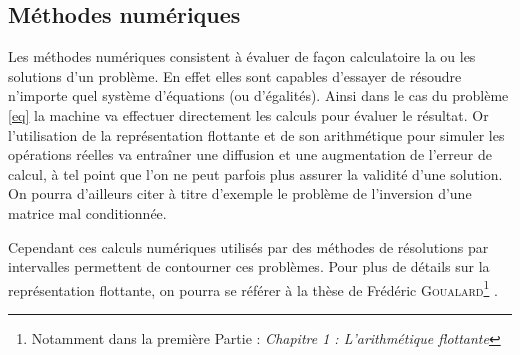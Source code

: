 \subsection{Méthodes numériques}
Les méthodes numériques consistent à évaluer de façon calculatoire la ou les solutions d'un problème. En effet elles sont capables d'essayer de résoudre n'importe quel système d'équations (ou d'égalités). Ainsi dans le cas du problème \ref{eq} la machine va effectuer directement les calculs pour évaluer le résultat. Or l'utilisation de la représentation flottante et de son arithmétique pour simuler les opérations réelles va entraîner une diffusion et une augmentation de l'erreur de calcul, à tel point que l'on ne peut  parfois plus assurer la validité d'une solution. On pourra d'ailleurs citer à titre d'exemple le problème de l'inversion d'une matrice mal conditionnée\cite{Conditionnement}. 

Cependant ces calculs numériques utilisés  par des méthodes de résolutions par intervalles permettent de contourner ces problèmes. Pour plus de détails sur la représentation flottante, on pourra se référer à la thèse de Frédéric \textsc{Goualard}\footnote{Notamment dans la première Partie : \emph{Chapitre 1 : L’arithmétique flottante}} \cite{Goualard}.

